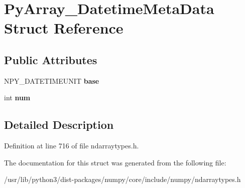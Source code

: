 \hypertarget{structPyArray__DatetimeMetaData}{}\section{Py\+Array\+\_\+\+Datetime\+Meta\+Data Struct Reference}
\label{structPyArray__DatetimeMetaData}
\subsection*{Public Attributes}
\begin{DoxyCompactItemize}
\item 
N\+P\+Y\+\_\+\+D\+A\+T\+E\+T\+I\+M\+E\+U\+N\+IT {\bfseries base}\hypertarget{structPyArray__DatetimeMetaData_aa16c15f1a31ae39fee54d1ded6b70129}{}\label{structPyArray__DatetimeMetaData_aa16c15f1a31ae39fee54d1ded6b70129}

\item 
int {\bfseries num}\hypertarget{structPyArray__DatetimeMetaData_ab60cb834f25c060d7c98dd26cffc2816}{}\label{structPyArray__DatetimeMetaData_ab60cb834f25c060d7c98dd26cffc2816}

\end{DoxyCompactItemize}


\subsection{Detailed Description}


Definition at line 716 of file ndarraytypes.\+h.



The documentation for this struct was generated from the following file\+:\begin{DoxyCompactItemize}
\item 
/usr/lib/python3/dist-\/packages/numpy/core/include/numpy/ndarraytypes.\+h\end{DoxyCompactItemize}
